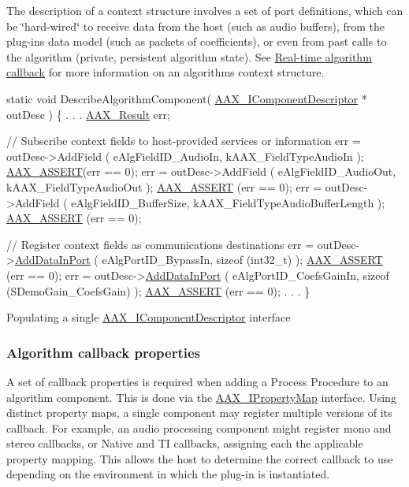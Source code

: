  The description of a context structure involves a set of port definitions, which can be \char`\"{}hard-\/wired\char`\"{} to receive data from the host (such as audio buffers), from the plug-\/in\textquotesingle{}s data model (such as packets of coefficients), or even from past calls to the algorithm (private, persistent algorithm state). See \hyperlink{a00327}{Real-\/time algorithm callback} for more information on an algorithm\textquotesingle{}s context structure.


\begin{DoxyCode}
\textcolor{keyword}{static} \textcolor{keywordtype}{void} DescribeAlgorithmComponent( \hyperlink{a00088}{AAX\_IComponentDescriptor} * outDesc )
\{
                    .
                    .
                    .
    \hyperlink{a00149_a4d8f69a697df7f70c3a8e9b8ee130d2f}{AAX\_Result}                    err;

    \textcolor{comment}{// Subscribe context fields to host-provided services or information}
    err = outDesc->AddField ( eAlgFieldID\_AudioIn, kAAX\_FieldTypeAudioIn ); 
      \hyperlink{a00158_a168ee44fd7a5485ab50160db36fb2988}{AAX\_ASSERT}(err == 0);
    err = outDesc->AddField ( eAlgFieldID\_AudioOut, kAAX\_FieldTypeAudioOut ); 
      \hyperlink{a00158_a168ee44fd7a5485ab50160db36fb2988}{AAX\_ASSERT} (err == 0);
    err = outDesc->AddField ( eAlgFieldID\_BufferSize, kAAX\_FieldTypeAudioBufferLength ); 
      \hyperlink{a00158_a168ee44fd7a5485ab50160db36fb2988}{AAX\_ASSERT} (err == 0);

    \textcolor{comment}{// Register context fields as communications destinations}
    err = outDesc->\hyperlink{a00088_a230293b9f6bb413626cd487ca501df75}{AddDataInPort} ( eAlgPortID\_BypassIn, \textcolor{keyword}{sizeof} (int32\_t) ); 
      \hyperlink{a00158_a168ee44fd7a5485ab50160db36fb2988}{AAX\_ASSERT} (err == 0);
    err = outDesc->\hyperlink{a00088_a230293b9f6bb413626cd487ca501df75}{AddDataInPort} ( eAlgPortID\_CoefsGainIn, \textcolor{keyword}{sizeof} (SDemoGain\_CoefsGain) ); 
      \hyperlink{a00158_a168ee44fd7a5485ab50160db36fb2988}{AAX\_ASSERT} (err == 0);
                    .
                    .
                    .
\}
\end{DoxyCode}
 Populating a single \hyperlink{a00088}{A\+A\+X\+\_\+\+I\+Component\+Descriptor} interface

\hypertarget{a00326_describe_component_properties}{}\subsubsection{Algorithm callback properties}\label{a00326_describe_component_properties}
 A set of callback properties is required when adding a Process Procedure to an algorithm component. This is done via the \hyperlink{a00112}{A\+A\+X\+\_\+\+I\+Property\+Map} interface. Using distinct property maps, a single component may register multiple versions of its callback. For example, an audio processing component might register mono and stereo callbacks, or Native and T\+I callbacks, assigning each the applicable property mapping. This allows the host to determine the correct callback to use depending on the environment in which the plug-\/in is instantiated.


